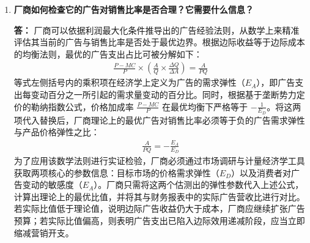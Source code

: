 \begin{enumerate}[label=\textbf{\arabic*.}, leftmargin=*]
\begin{center}
		\end{center}
		\newpage
		\item \textbf{厂商如何检查它的广告对销售比率是否合理？它需要什么信息？}
		
		\textbf{答：}
		厂商可以依据利润最大化条件推导出的广告经验法则，从数学上来精准评估其当前的广告与销售比率是否处于最优边界。根据边际收益等于边际成本的均衡法则，最优的广告支出占比可被分解如下：
		\[
		\begin{aligned}
			\frac{P - MC}{P} \times \left( \frac{A}{Q} \times \frac{\Delta Q}{\Delta A} \right) = \frac{A}{PQ}
		\end{aligned}
		\]
		等式左侧括号内的乘积项在经济学上定义为广告的需求弹性（$E_A$），即广告支出每变动百分之一所引起的需求量变动的百分比。同时，根据基于垄断势力定价的勒纳指数公式，价格加成率 $\frac{P - MC}{P}$ 在最优均衡下严格等于 $-\frac{1}{E_D}$。将这两项代入替换后，厂商理论上的最优广告对销售比率必须等于负的广告需求弹性与产品价格弹性之比：
		\[
		\begin{aligned}
			\frac{A}{PQ} = -\frac{E_A}{E_D}
		\end{aligned}
		\]
		为了应用该数学法则进行实证检验，厂商必须通过市场调研与计量经济学工具获取两项核心的参数信息：目标市场的价格需求弹性（$E_D$）以及消费者对广告变动的敏感度（$E_A$）。厂商只需将这两个估测出的弹性参数代入上述公式，计算出理论上的最优比值，并将其与财务报表中的实际广告营收比进行对比。若实际比值低于理论值，说明边际广告收益仍大于成本，厂商应继续扩张广告预算；若实际比值偏高，则表明广告支出已陷入边际效用递减阶段，应当立即缩减营销开支。
		
		\newpage
	\end{enumerate}
